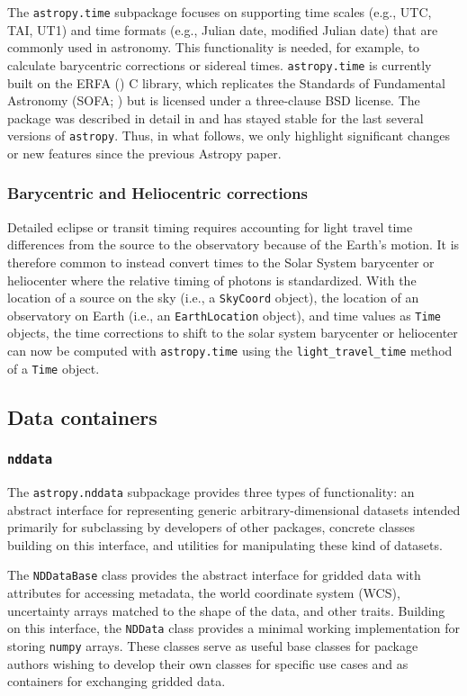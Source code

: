 \documentclass[modern]{aastex62}
\newcommand{\package}[1]{\texttt{#1}\xspace}
\newcommand{\astropy}{Astropy\xspace}
\newcommand{\astropypkg}{\package{astropy}}
\begin{document}
The \package{astropy.time} subpackage focuses on supporting time scales (e.g.,
UTC, TAI, UT1) and time formats (e.g., Julian date, modified Julian date) that
are commonly used in astronomy.
This functionality is needed, for example, to calculate barycentric corrections
or sidereal times.
\package{astropy.time} is currently built on the ERFA (\citealt{erfa}) C
library, which replicates the Standards of Fundamental Astronomy (SOFA;
\citealt{sofa}) but is licensed under a three-clause BSD license.
The package was described in detail in  \citet{astropy} and has
stayed stable for the last several versions of \astropypkg.
Thus, in what follows, we only highlight significant changes or new features
since the previous \astropy paper.

\subsubsection{Barycentric and Heliocentric corrections}
Detailed eclipse or transit
timing requires accounting for light travel time differences from the
source to the observatory because of the Earth's motion.
It is therefore common to instead convert times to the Solar System
barycenter or heliocenter where the relative timing of photons is
standardized.
With the location of a source on the sky (i.e., a \texttt{SkyCoord}
object), the location of an observatory on Earth (i.e., an
\texttt{EarthLocation} object), and time values as \texttt{Time}
objects, the time corrections to shift to the solar system barycenter or
heliocenter can now be computed with \package{astropy.time} using the
\texttt{light\_travel\_time} method of a \texttt{Time} object.

\subsection{Data containers}

\subsubsection{\package{nddata}}

The \package{astropy.nddata} subpackage provides three types of functionality: an
abstract interface for representing generic arbitrary-dimensional datasets
intended primarily for subclassing by developers of other packages, concrete
classes building on this interface, and utilities for manipulating these kind of
datasets.

The \texttt{NDDataBase} class provides the abstract interface for gridded data
with attributes for accessing metadata, the world coordinate system (WCS),
uncertainty arrays matched to the shape of the data, and other traits.
Building on this interface, the \texttt{NDData} class provides a minimal
working implementation for storing \package{numpy} arrays. These classes serve
as useful base classes for package authors wishing to develop their own classes
for specific use cases and as containers for exchanging gridded data.
\end{document}
